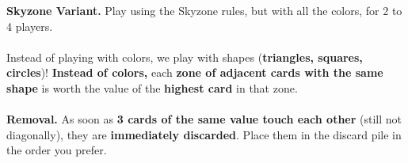 \documentclass[a4paper]{memoir}
\begin{document}
{\footnotesize

\noindent 
\textbf{ Skyzone Variant.} 
Play using the Skyzone rules, but with all the colors, for 2 to 4 players.
\\
\\
\noindent
{} Instead of playing with colors, we play with shapes (\textbf{triangles, squares, circles})!  
\textbf{Instead of colors,} each \textbf{zone of adjacent cards with the same shape} is worth the value of the \textbf{highest card} in that zone.
\\
\\
\noindent
\textbf{ Removal.} 
As soon as \textbf{3 cards of the same value touch each other} (still not diagonally), they are \textbf{immediately discarded}.  
Place them in the discard pile in the order you prefer.
}
\end{document}
